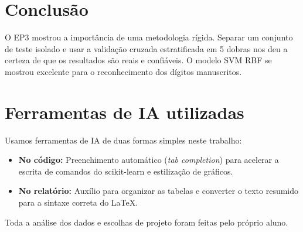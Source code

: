 \documentclass[11pt,a4paper]{article}
\begin{document}
\section{Conclusão}
O EP3 mostrou a importância de uma metodologia rígida. Separar um conjunto de teste isolado e usar a validação cruzada estratificada em 5 dobras nos deu a certeza de que os resultados são reais e confiáveis. O modelo SVM RBF se mostrou excelente para o reconhecimento dos dígitos manuscritos.

\section{Ferramentas de IA utilizadas}
Usamos ferramentas de IA de duas formas simples neste trabalho:
\begin{itemize}
    \item \textbf{No código:} Preenchimento automático (\textit{tab completion}) para acelerar a escrita de comandos do scikit-learn e estilização de gráficos.
    \item \textbf{No relatório:} Auxílio para organizar as tabelas e converter o texto resumido para a sintaxe correta do \LaTeX.
\end{itemize}
Toda a análise dos dados e escolhas de projeto foram feitas pelo próprio aluno.
\end{document}

